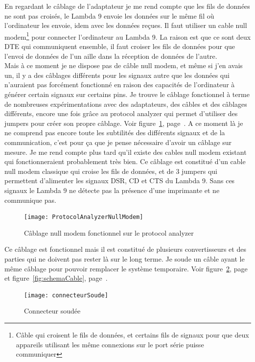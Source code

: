 \documentclass[12pt]{article}
\begin{document}
En regardant le câblage de l'adaptateur je me rend compte que les fils de données ne sont pas croisés, le Lambda 9 envoie les données sur le même fil où l'ordinateur les envoie, idem avec les données reçues.
Il faut utiliser un cable null modem\footnote{Câble qui croisent le fils de données, et certains fils de signaux pour que deux appareils utilisant les même connexions sur le port série puisse communiquer} pour connecter l'ordinateur au Lambda 9.
La raison est que ce sont deux DTE qui communiquent ensemble, il faut croiser les fils de données pour que l'envoi de données de l'un aille dans la réception de données de l'autre.\\
Mais à ce moment je ne dispose pas de câble null modem, et même si j'en avais un, il y a des câblages différents pour les signaux autre que les données qui n'auraient pas forcément fonctionné en raison des capacités de l'ordinateur à générer certain signaux sur certains pins.
Je trouve le câblage fonctionnel à terme de nombreuses expérimentations avec des adaptateurs, des câbles et des câblages différents, encore une fois grâce au protocol analyzer qui permet d'utiliser des jumpers pour créer son propre câblage.
Voir figure~\ref{fig:cablageProtocolAnalyzer}, page~\pageref{fig:cablageProtocolAnalyzer}.
A ce moment là je ne comprend pas encore toute les subtilités des différents signaux et de la communication, c'est pour ça que je pense nécessaire d'avoir un câblage sur mesure.
Je me rend compte plus tard qu'il existe des cables null modem existant qui fonctionneraient probablement très bien.
Ce câblage est constitué d'un cable null modem classique qui croise les fils de données, et de 3 jumpers qui permettent d'alimenter les signaux DSR, CD et CTS du Lambda 9.
Sans ces signaux le Lambda 9 ne détecte pas la présence d'une imprimante et ne communique pas.
\begin{figure}[H]
	\centering
	\texttt{[image: ProtocolAnalyzerNullModem]}
	\caption{Câblage null modem fonctionnel sur le protocol analyzer}
	\label{fig:cablageProtocolAnalyzer}
\end{figure}
Ce câblage est fonctionnel mais il est constitué de plusieurs convertisseurs et des parties qui ne doivent pas rester là sur le long terme.
Je soude un câble ayant le même câblage pour pouvoir remplacer le système temporaire.
Voir figure~\ref{fig:connecteurSoudee}, page~\pageref{fig:connecteurSoudee} et figure~\ref{fig:schemaCable}, page~\pageref{fig:schemaCable}.
\begin{figure}[h]
	\centering
	\texttt{[image: connecteurSoude]}
	\caption{Connecteur soudée}
	\label{fig:connecteurSoudee}
\end{figure}
\end{document}
